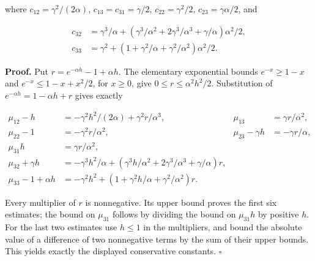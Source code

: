 \documentclass[11pt,a4paper]{report}
\begin{document}
where \(c_{12}=\gamma^2/(2\alpha)\), \(c_{13}=c_{31}=\gamma/2\), \(c_{22}=\gamma^2/2\), \(c_{23}=\gamma\alpha/2\), and

\[\begin{aligned}c_{32}&=\gamma^3/\alpha+(\gamma^3/\alpha^2+2\gamma^3/\alpha^3+\gamma/\alpha)\alpha^2/2,\\c_{33}&=\gamma^2+(1+\gamma^2/\alpha+\gamma^2/\alpha^2)\alpha^2/2.\end{aligned}\]

\textbf{Proof.} Put \(r=e^{-\alpha h}-1+\alpha h\). The elementary exponential bounds \(e^{-x}\ge1-x\) and \(e^{-x}\le1-x+x^2/2\), for \(x\ge0\), give \(0\le r\le\alpha^2h^2/2\). Substitution of \(e^{-\alpha h}=1-\alpha h+r\) gives exactly

\[\begin{aligned}\mu_{12}-h&=-\gamma^2h^2/(2\alpha)+\gamma^2r/\alpha^3,&\mu_{13}&=\gamma r/\alpha^2,\\\mu_{22}-1&=-\gamma^2r/\alpha^2,&\mu_{23}-\gamma h&=-\gamma r/\alpha,\\\mu_{31}h&=\gamma r/\alpha^2,\\\mu_{32}+\gamma h&=-\gamma^3h^2/\alpha+(\gamma^3h/\alpha^2+2\gamma^3/\alpha^3+\gamma/\alpha)r,\\\mu_{33}-1+\alpha h&=-\gamma^2h^2+(1+\gamma^2h/\alpha+\gamma^2/\alpha^2)r.\end{aligned}\]

Every multiplier of \(r\) is nonnegative. Its upper bound proves the first six estimates; the bound on \(\mu_{31}\) follows by dividing the bound on \(\mu_{31}h\) by positive \(h\). For the last two estimates use \(h\le1\) in the multipliers, and bound the absolute value of a difference of two nonnegative terms by the sum of their upper bounds. This yields exactly the displayed conservative constants. \(\square\)
\end{document}
